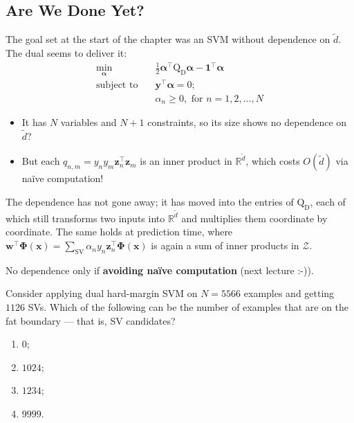 \subsection{Are We Done Yet?}

The goal set at the start of the chapter was an SVM without dependence on
\(\tilde{d}\). The dual seems to deliver it:
\[
    \begin{aligned}
        \min_{\bm{\alpha}} \quad & \frac{1}{2} \bm{\alpha}^\top
            \mathrm{Q}_{\mathrm{D}} \bm{\alpha} - \bm{1}^\top \bm{\alpha}\\
        \text{subject to} \quad & \bm{y}^\top \bm{\alpha} = 0;\\
        & \alpha_n \ge 0, \text{ for } n = 1, 2, \dots , N
    \end{aligned}
\]
\begin{itemize}
    \item It has \(N\) variables and \(N + 1\) constraints, so its size shows
        no dependence on \(\tilde{d}\)?
    \item But each \(q_{n,m} = y_n y_m \bm{z}_n^\top \bm{z}_m\) is an inner
        product in \(\mathbb{R}^{\tilde{d}}\), which costs \(O(\tilde{d})\)
        via na\"ive computation!
\end{itemize}

The dependence has not gone away; it has moved into the entries of
\(\mathrm{Q}_{\mathrm{D}}\), each of which still transforms two inputs into
\(\mathbb{R}^{\tilde{d}}\) and multiplies them coordinate by coordinate.
The same holds at prediction time, where \(\bm{w}^\top \bm{\Phi}(\bm{x}) =
\sum_{\text{SV}} \alpha_n y_n \bm{z}_n^\top \bm{\Phi}(\bm{x})\) is again a
sum of inner products in \(\mathcal{Z}\).

\begin{moral}
    No dependence only if \textbf{avoiding na\"ive computation} (next
    lecture :-)).
\end{moral}

\begin{exercise}
    Consider applying dual hard-margin SVM on \(N = 5566\) examples and
    getting \(1126\) SVs. Which of the following can be the number of
    examples that are on the fat boundary --- that is, SV candidates?
    \begin{enumerate}[(1)]
        \item \(0\);
        \item \(1024\);
        \item \(1234\);
        \item \(9999\).
    \end{enumerate}
\end{exercise}

